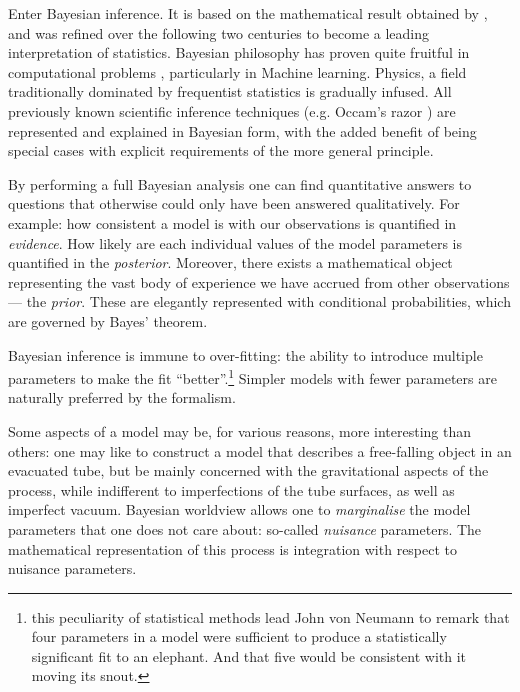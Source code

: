 \documentclass[usenatbib]{mnras}
\begin{document}
Enter Bayesian inference. It is based on the mathematical result
obtained by \cite{1763}, and was refined over the following two
centuries to become a leading interpretation of statistics. Bayesian
philosophy has proven quite fruitful in computational problems
\citep{Wolpert2004}, particularly in Machine learning. Physics, a
field traditionally dominated by frequentist statistics is gradually
infused. All previously known scientific inference techniques
(e.g. Occam's razor \cite{Occam}) are represented and explained in
Bayesian form, with the added benefit of being special cases with
explicit requirements of the more general principle.

By performing a full Bayesian analysis one can find quantitative
answers to questions that otherwise could only have been answered
qualitatively.  For example: how consistent a model is with our
observations is quantified in \emph{evidence}. How likely are each
individual values of the model parameters is quantified in the
\emph{posterior}. Moreover, there exists a mathematical object
representing the vast body of experience we have accrued from other
observations --- the \emph{prior}. These are elegantly represented with
conditional probabilities, which are governed by Bayes' theorem.

Bayesian inference is immune to over-fitting: the ability to
introduce multiple parameters to make the fit ``better''.\footnote{this
peculiarity of statistical methods lead John von Neumann to remark
that four parameters in a model were sufficient to produce a
statistically significant fit to an elephant. And that five would
be consistent with it moving its snout.} Simpler models with fewer
parameters are naturally preferred by the formalism. 

Some aspects of a model may be, for various reasons, more
interesting than others: one may like to construct a model that
describes a free-falling object in an evacuated tube, but be mainly
concerned with the gravitational aspects of the process, while
indifferent to imperfections of the tube surfaces, as well as
imperfect vacuum. Bayesian worldview allows one to \emph{marginalise} the
model parameters that one does not care about: so-called \emph{nuisance}
parameters. The mathematical representation of this process is
integration with respect to nuisance parameters. 
\end{document}
